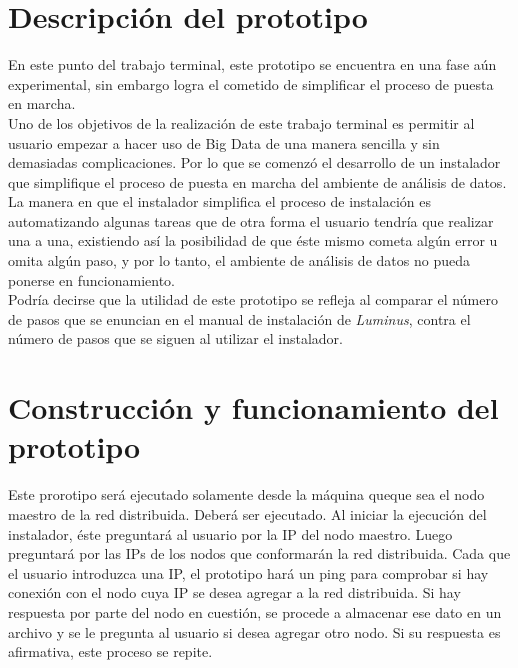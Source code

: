 \section{Descripción del prototipo}
En este punto del trabajo terminal, este prototipo se encuentra en una fase aún experimental, sin embargo logra el 
cometido de simplificar el proceso de puesta en marcha.\\

Uno de los objetivos de la realización de este trabajo terminal es permitir al usuario empezar a hacer uso de Big Data de una manera sencilla y sin demasiadas complicaciones. Por lo que se comenzó el desarrollo de un instalador que simplifique el proceso de puesta en marcha del ambiente de análisis de datos.\\

La manera en que el instalador simplifica el proceso de instalación es automatizando algunas tareas que de otra forma el usuario tendría que realizar una a una, existiendo así la posibilidad de que éste mismo cometa algún error u omita algún paso, y por lo tanto, el ambiente de análisis de datos no pueda ponerse en funcionamiento.\\

Podría decirse que la utilidad de este prototipo se refleja al comparar el número de pasos que se enuncian en el manual de instalación de \emph{Luminus}, contra el número de pasos que se siguen al utilizar el instalador.\\

\section{Construcción y funcionamiento del prototipo}
Este prorotipo será ejecutado solamente desde la máquina queque sea el nodo maestro de la red distribuida. Deberá ser ejecutado. Al iniciar la ejecución del instalador, éste preguntará al usuario por la IP del nodo maestro. Luego preguntará por las IPs de los nodos que conformarán la red distribuida. Cada que el usuario introduzca una IP, el prototipo hará un ping para comprobar si hay conexión con el nodo cuya IP se desea agregar a la red distribuida. Si hay respuesta por parte del nodo en cuestión, se procede a almacenar ese dato en un archivo y se le pregunta al usuario si desea agregar otro nodo. Si su respuesta es afirmativa, este proceso se repite. 

